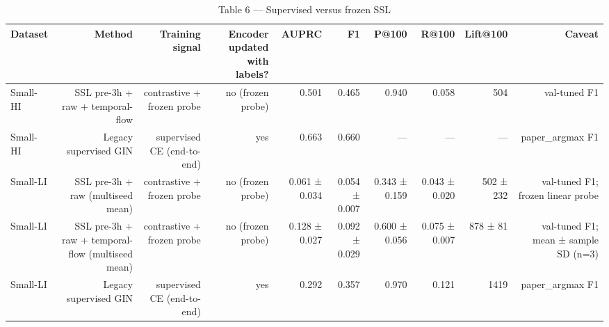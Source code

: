 \begin{table}[t]
\centering
\caption{Table 6 — Supervised versus frozen SSL}
\begin{tabular}{lrrrrrrrrr}
\toprule
Dataset & Method & Training signal & Encoder updated with labels? & AUPRC & F1 & P@100 & R@100 & Lift@100 & Caveat \\
\midrule
Small-HI & SSL pre-3h + raw + temporal-flow & contrastive + frozen probe & no (frozen probe) & 0.501 & 0.465 & 0.940 & 0.058 & 504 & val-tuned F1 \\
Small-HI & Legacy supervised GIN & supervised CE (end-to-end) & yes & 0.663 & 0.660 & --- & --- & --- & paper\_argmax F1 \\
Small-LI & SSL pre-3h + raw (multiseed mean) & contrastive + frozen probe & no (frozen probe) & 0.061 ± 0.034 & 0.054 ± 0.007 & 0.343 ± 0.159 & 0.043 ± 0.020 & 502 ± 232 & val-tuned F1; frozen linear probe \\
Small-LI & SSL pre-3h + raw + temporal-flow (multiseed mean) & contrastive + frozen probe & no (frozen probe) & 0.128 ± 0.027 & 0.092 ± 0.029 & 0.600 ± 0.056 & 0.075 ± 0.007 & 878 ± 81 & val-tuned F1; mean ± sample SD (n=3) \\
Small-LI & Legacy supervised GIN & supervised CE (end-to-end) & yes & 0.292 & 0.357 & 0.970 & 0.121 & 1419 & paper\_argmax F1 \\
\bottomrule
\end{tabular}
\end{table}

